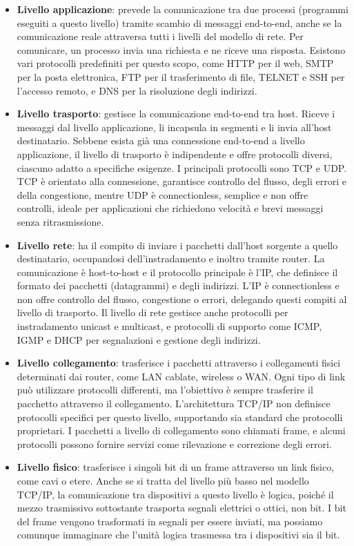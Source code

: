 \documentclass[12pt]{report}
\begin{document}
	\begin{itemize}
		\item \textbf{Livello applicazione}: prevede la comunicazione tra due processi (programmi eseguiti a questo livello) tramite scambio di messaggi end-to-end, anche se la comunicazione reale attraversa tutti i livelli del modello di rete. Per comunicare, un processo invia una richiesta e ne riceve una risposta. Esistono vari protocolli predefiniti per questo scopo, come HTTP per il web, SMTP per la posta elettronica, FTP per il trasferimento di file, TELNET e SSH per l'accesso remoto, e DNS per la risoluzione degli indirizzi.

		\item \textbf{Livello trasporto}: gestisce la comunicazione end-to-end tra host. Riceve i messaggi dal livello applicazione, li incapsula in segmenti e li invia all'host destinatario. Sebbene esista già una connessione end-to-end a livello applicazione, il livello di trasporto è indipendente e offre protocolli diversi, ciascuno adatto a specifiche esigenze. I principali protocolli sono TCP e UDP. TCP è orientato alla connessione, garantisce controllo del flusso, degli errori e della congestione, mentre UDP è connectionless, semplice e non offre controlli, ideale per applicazioni che richiedono velocità e brevi messaggi senza ritrasmissione.

		\item \textbf{Livello rete}: ha il compito di inviare i pacchetti dall'host sorgente a quello destinatario, occupandosi dell'instradamento e inoltro tramite router. La comunicazione è host-to-host e il protocollo principale è l'IP, che definisce il formato dei pacchetti (datagrammi) e degli indirizzi. L'IP è connectionless e non offre controllo del flusso, congestione o errori, delegando questi compiti al livello di trasporto. Il livello di rete gestisce anche protocolli per instradamento unicast e multicast, e protocolli di supporto come ICMP, IGMP e DHCP per segnalazioni e gestione degli indirizzi.

		\item \textbf{Livello collegamento}: trasferisce i pacchetti attraverso i collegamenti fisici determinati dai router, come LAN cablate, wireless o WAN. Ogni tipo di link può utilizzare protocolli differenti, ma l'obiettivo è sempre trasferire il pacchetto attraverso il collegamento. L'architettura TCP/IP non definisce protocolli specifici per questo livello, supportando sia standard che protocolli proprietari. I pacchetti a livello di collegamento sono chiamati frame, e alcuni protocolli possono fornire servizi come rilevazione e correzione degli errori.

		\item \textbf{Livello fisico}: trasferisce i singoli bit di un frame attraverso un link fisico, come cavi o etere. Anche se si tratta del livello più basso nel modello TCP/IP, la comunicazione tra dispositivi a questo livello è logica, poiché il mezzo trasmissivo sottostante trasporta segnali elettrici o ottici, non bit. I bit del frame vengono trasformati in segnali per essere inviati, ma possiamo comunque immaginare che l'unità logica trasmessa tra i dispositivi sia il bit.
	\end{itemize}
\end{document}
